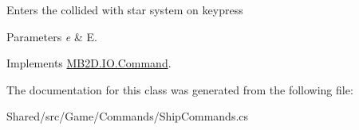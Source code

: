 Enters the collided with star system on keypress 


\begin{DoxyParams}{Parameters}
{\em e} & E.\\
\hline
\end{DoxyParams}


Implements \hyperlink{class_m_b2_d_1_1_i_o_1_1_command_ae927e36c0e285848325cc68eddb5fd72}{M\+B2\+D.\+I\+O.\+Command}.



The documentation for this class was generated from the following file\+:\begin{DoxyCompactItemize}
\item 
Shared/src/\+Game/\+Commands/Ship\+Commands.\+cs\end{DoxyCompactItemize}
